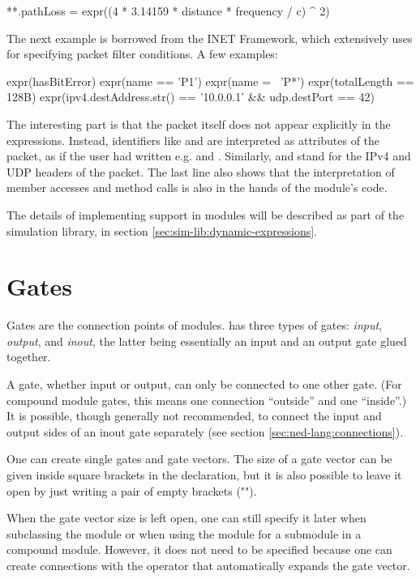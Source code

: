 \begin{inifile}
**.pathLoss = expr((4 * 3.14159 * distance * frequency / c) ^ 2)
\end{inifile}

The next example is borrowed from the INET Framework, which extensively uses
 for specifying packet filter conditions. A few examples:

\begin{ned}
expr(hasBitError)
expr(name == 'P1')
expr(name =~ 'P*')
expr(totalLength == 128B)
expr(ipv4.destAddress.str() == '10.0.0.1' && udp.destPort == 42)
\end{ned}

The interesting part is that the packet itself does not appear explicitly in the
expressions. Instead, identifiers like  and  are
interpreted as attributes of the packet, as if the user had written e.g.
 and . Similarly,  and 
stand for the IPv4 and UDP headers of the packet. The last line also shows that
the interpretation of member accesses and method calls is also in the hands of
the module's code.

The details of implementing  support in modules will be
described as part of the simulation library, in section
\ref{sec:sim-lib:dynamic-expressions}.


\section{Gates}
\label{sec:ned-lang:gates}

Gates are the connection points of modules. {\opp} has three types of
gates: \textit{input}, \textit{output}, and \textit{inout}, the latter being
essentially an input and an output gate glued together.

A gate, whether input or output, can only be connected to one other
gate. (For compound module gates, this means one connection ``outside'' and
one ``inside''.) It is possible, though generally not recommended, to
connect the input and output sides of an inout gate separately (see section
\ref{sec:ned-lang:connections}).

One can create single gates and gate vectors. The size of a gate vector
can be given inside square brackets in the declaration, but it is also possible
to leave it open by just writing a pair of empty brackets ("\ttt{[]}").

When the gate vector size is left open, one can still specify it later
when subclassing the module or when using the module for a submodule in a
compound module. However, it does not need to be specified because
one can create connections with the  operator that
automatically expands the gate vector.

